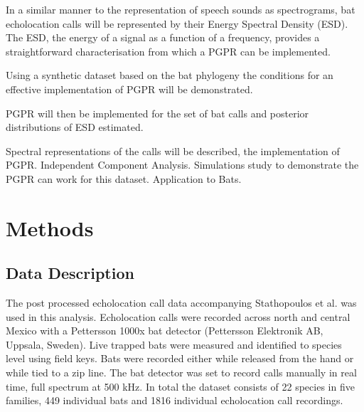\documentclass[wsdraft]{ws-rv9x6} %
\begin{document}
In a similar manner to the representation of speech sounds as spectrograms,\cite{pigoli2015analysis} bat echolocation calls will be represented by their Energy Spectral Density\cite{antoniou2006digital} (ESD). The ESD, the energy of a signal as a function of a frequency, provides a straightforward characterisation from which a PGPR can be implemented. 

Using a synthetic dataset based on the bat phylogeny the conditions for an effective implementation of PGPR will be demonstrated. 

PGPR will then be implemented for the set of bat calls and posterior distributions of ESD estimated.

Spectral representations of the calls will be described, the implementation of PGPR. Independent Component Analysis. Simulations study to demonstrate the PGPR can work for this dataset. Application to Bats.

\section{Methods}

\subsection{Data Description}

The post processed echolocation call data accompanying Stathopoulos et al. \cite{stathopoulos2017bat} was used in this analysis. Echolocation calls were recorded across north and central Mexico with a Pettersson 1000x bat detector (Pettersson Elektronik AB, Uppsala, Sweden). Live trapped bats were measured and identified to species level using field keys.\cite{ceballos2005mamiferos} \cite{medellin2sanchez} Bats were recorded either while released from the hand or while tied to a zip line. The bat detector was set to record calls manually in real time, full spectrum at 500 kHz. 
In total the dataset consists of 22 species in five families, 449 individual bats and 1816 individual echolocation call recordings.
\end{document}

